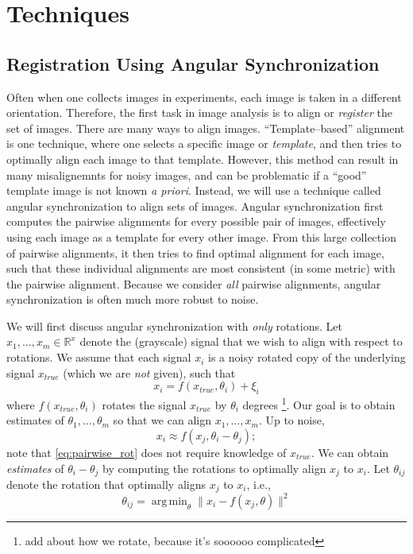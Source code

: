 \documentclass[11pt]{article}
\DeclareMathOperator*{\argmin}{arg\,min}
\begin{document}
\section{Techniques}

\subsection{Registration Using Angular Synchronization} \label{subsec:angsynch}

Often when one collects images in experiments, each image is taken in a different orientation. 
%
Therefore, the first task in image analysis is to align or {\em register} the set of images. 
%
There are many ways to align images. 
%
``Template--based'' alignment \cite{ahuja2007template} is one technique, where one selects a specific image or {\em template}, and then tries to optimally align each image to that template.
%
However, this method can result in many misalignemnts for noisy images, and can be problematic if a ``good'' template image is not known {\em a priori}. 
%
Instead, we will use a technique called angular synchronization\cite{singer2011angular} to align sets of images.
%
Angular synchronization first computes the pairwise alignments for every possible pair of images, effectively using each image as a template for every other image.
%
From this large collection of pairwise alignments, it then tries to find optimal alignment for each image, such that these individual alignments are most consistent (in some metric) with the pairwise alignment.
%
Because we consider {\em all} pairwise alignments, angular synchronization is often much more robust to noise. 

We will first discuss angular synchronization with {\em only} rotations. 
%
Let $x_1, \dots, x_m \in \mathbb{R}^x$ denote the (grayscale) signal that we wish to align with respect to rotations.
%
We assume that each signal $x_i$ is a noisy rotated copy of the underlying signal $x_{true}$ (which we are {\em not} given), such that 
\begin{equation}
x_i = f(x_{true}, \theta_i) + \xi_i
\end{equation}
where $f(x_{true}, \theta_i)$ rotates the signal $x_{true}$ by $\theta_i$ degrees \footnote{add about how we rotate, because it's soooooo complicated}. 
%
Our goal is to obtain estimates of $\theta_1, \dots, \theta_m$ so that we can align $x_1, \dots, x_m$. 
%
Up to noise, 
\begin{equation} \label{eq:pairwise_rot}
x_i \approx f(x_j, \theta_i - \theta_j) ;
\end{equation}
 note that \eqref{eq:pairwise_rot} does not require knowledge of $x_{true}$.
%
We can obtain {\em estimates} of $\theta_i - \theta_j$ by computing the rotations to optimally align $x_j$ to $x_i$. 
%
Let $\theta_{ij}$ denote the rotation that optimally aligns $x_j$ to $x_i$, i.e.,
%
\begin{equation} \label{eq:opt_angle}
\theta_{ij} = \argmin_{\theta} \|x_i - f(x_j, \theta)\|^2
\end{equation}
\end{document}

